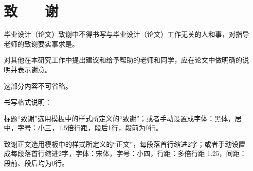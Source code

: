 
\chapter*{\hfill 致　　谢 \hfill}
\linespread{1.25}
毕业设计（论文）致谢中不得书写与毕业设计（论文）工作无关的人和事，对指导老师的致谢要实事求是。

对其他在本研究工作中提出建议和给予帮助的老师和同学，应在论文中做明确的说明并表示谢意。

这部分内容不可省略。

书写格式说明：

标题“致谢”选用模板中的样式所定义的“致谢”；或者手动设置成字体：黑体，居中，字号：小三，1.5倍行距，段后1行，段前为0行。

致谢正文选用模板中的样式所定义的“正文”，每段落首行缩进2字；或者手动设置成每段落首行缩进2字，字体：宋体，字号：小四，行距：多倍行距 1.25，间距：段前、段后均为0行。

